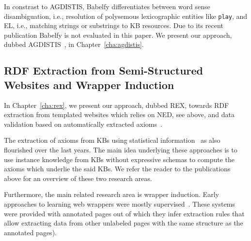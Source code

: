 In constrast to AGDISTIS, Babelfy differentiates between word sense disambiguation, i.e., resolution of polysemous lexicographic entities like \texttt{play}, and \ac{EL}, i.e., matching strings or substrings to \ac{KB} resources.
Due to its recent publication Babelfy is not evaluated in this paper.
We present our approach, dubbed AGDISTIS~\cite{agdistis_iswc}, in Chapter~\ref{cha:agdistis}. 



\subsection{RDF Extraction from Semi-Structured Websites and Wrapper Induction}

In Chapter~\ref{cha:rex}, we present our approach, dubbed REX, towards \ac{RDF} extraction from templated websites which relies on \ac{NED}, see above, and data validation based on automatically extracted axioms~\cite{Buehmann2012}. 
\bigskip

The extraction of axioms from \ac{KB}s using statistical information~\cite{Buehmann2012,pattern_enrichment} as also flourished over the last years. 
The main idea underlying these approaches is to use instance knowledge from  \ac{KB}s without expressive schemas to compute the axioms which underlie the said  \ac{KB}s. 
We refer the reader to the publications above for an overview of these two research areas.
\bigskip

Furthermore, the main related research area is wrapper induction. 
Early approaches to learning web wrappers were mostly supervised~\cite{flesca2004web,Hogue:2005:TAU:1060745.1060762}. 
These systems were provided with annotated pages out of which they infer extraction rules that allow extracting data from other unlabeled pages with the same structure as the annotated pages). 

